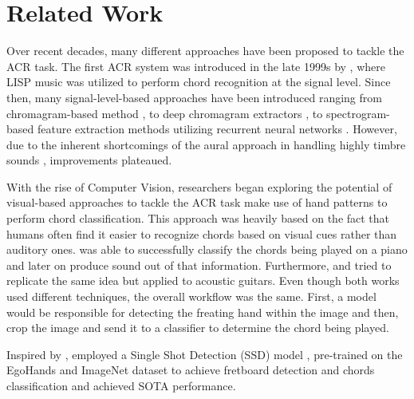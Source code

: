 \documentclass[10pt,twocolumn,letterpaper]{article}
\begin{document}
\section{Related Work}  
Over recent decades, many different approaches have been proposed to tackle the ACR task. The first ACR system was introduced in the late 1999s by \cite{takuya1999realtime}, where LISP music was utilized to perform chord recognition at the signal level. Since then, many signal-level-based approaches have been introduced ranging from chromagram-based method \cite{stark2009real}, to deep chromagram extractors \cite{korzeniowski2016feature}, to spectrogram-based feature extraction methods utilizing recurrent neural networks \cite{boulanger2013audio}. However, due to the inherent shortcomings of the aural approach in handling highly timbre sounds \cite{du2023conditional}, improvements plateaued. 

With the rise of Computer Vision, researchers began exploring the potential of visual-based approaches to tackle the ACR task make use of hand patterns to perform chord classification. This approach was heavily based on the fact that humans often find it easier to recognize chords based on visual cues rather than auditory ones. \cite{su2020audeo} was able to successfully classify the chords being played on a piano and later on produce sound out of that information. Furthermore, \cite{tran2019cnn} and \cite{ooaku2018guitar} tried to replicate the same idea but applied to acoustic guitars. Even though both works used different techniques, the overall workflow was the same. First, a model would be responsible for detecting the freating hand within the image and then, crop the image and send it to a classifier to determine the chord being played.

Inspired by \cite{tran2019cnn, ooaku2018guitar}, \cite{Kristian_Zaman_Tenoyo_Jodhinata_2024} employed a Single Shot Detection (SSD) model \cite{sandler2018mobilenetv2}, pre-trained on the EgoHands \cite{Bambach_2015_ICCV} and ImageNet \cite{deng2009imagenet} dataset to achieve fretboard detection and chords classification and achieved SOTA performance.

\end{document}
